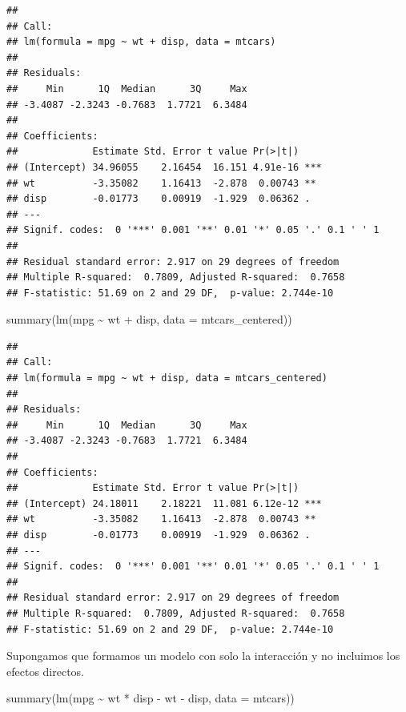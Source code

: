 \documentclass[
  12pt,
]{book}
\newenvironment{Shaded}{\begin{snugshade}}{\end{snugshade}}
\newcommand{\AttributeTok}[1]{\textcolor[rgb]{0.77,0.63,0.00}{#1}}
\newcommand{\FunctionTok}[1]{\textcolor[rgb]{0.00,0.00,0.00}{#1}}
\newcommand{\NormalTok}[1]{#1}
\newcommand{\SpecialCharTok}[1]{\textcolor[rgb]{0.00,0.00,0.00}{#1}}
\theoremstyle{definition}
\theoremstyle{definition}
\theoremstyle{definition}
\theoremstyle{definition}
\theoremstyle{remark}
\begin{document}
\begin{verbatim}
## 
## Call:
## lm(formula = mpg ~ wt + disp, data = mtcars)
## 
## Residuals:
##     Min      1Q  Median      3Q     Max 
## -3.4087 -2.3243 -0.7683  1.7721  6.3484 
## 
## Coefficients:
##             Estimate Std. Error t value Pr(>|t|)    
## (Intercept) 34.96055    2.16454  16.151 4.91e-16 ***
## wt          -3.35082    1.16413  -2.878  0.00743 ** 
## disp        -0.01773    0.00919  -1.929  0.06362 .  
## ---
## Signif. codes:  0 '***' 0.001 '**' 0.01 '*' 0.05 '.' 0.1 ' ' 1
## 
## Residual standard error: 2.917 on 29 degrees of freedom
## Multiple R-squared:  0.7809, Adjusted R-squared:  0.7658 
## F-statistic: 51.69 on 2 and 29 DF,  p-value: 2.744e-10
\end{verbatim}

\begin{Shaded}
\begin{Highlighting}[]
\FunctionTok{summary}\NormalTok{(}\FunctionTok{lm}\NormalTok{(mpg }\SpecialCharTok{\textasciitilde{}}\NormalTok{ wt }\SpecialCharTok{+}\NormalTok{ disp, }\AttributeTok{data =}\NormalTok{ mtcars\_centered))}
\end{Highlighting}
\end{Shaded}

\begin{verbatim}
## 
## Call:
## lm(formula = mpg ~ wt + disp, data = mtcars_centered)
## 
## Residuals:
##     Min      1Q  Median      3Q     Max 
## -3.4087 -2.3243 -0.7683  1.7721  6.3484 
## 
## Coefficients:
##             Estimate Std. Error t value Pr(>|t|)    
## (Intercept) 24.18011    2.18221  11.081 6.12e-12 ***
## wt          -3.35082    1.16413  -2.878  0.00743 ** 
## disp        -0.01773    0.00919  -1.929  0.06362 .  
## ---
## Signif. codes:  0 '***' 0.001 '**' 0.01 '*' 0.05 '.' 0.1 ' ' 1
## 
## Residual standard error: 2.917 on 29 degrees of freedom
## Multiple R-squared:  0.7809, Adjusted R-squared:  0.7658 
## F-statistic: 51.69 on 2 and 29 DF,  p-value: 2.744e-10
\end{verbatim}

Supongamos que formamos un modelo con solo la interacción y no incluimos los efectos directos.

\begin{Shaded}
\begin{Highlighting}[]
\FunctionTok{summary}\NormalTok{(}\FunctionTok{lm}\NormalTok{(mpg }\SpecialCharTok{\textasciitilde{}}\NormalTok{ wt }\SpecialCharTok{*}\NormalTok{ disp }\SpecialCharTok{{-}}\NormalTok{ wt }\SpecialCharTok{{-}}\NormalTok{ disp, }\AttributeTok{data =}\NormalTok{ mtcars))}
\end{Highlighting}
\end{Shaded}
\end{document}
